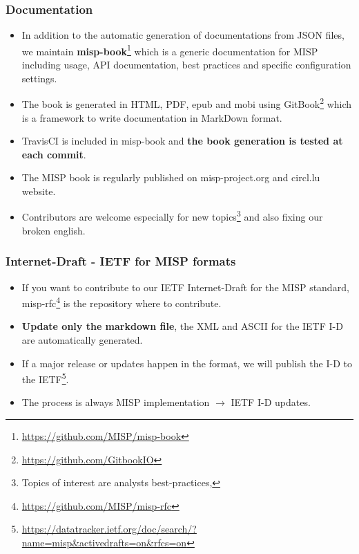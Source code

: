 \begin{frame}[fragile]
\frametitle{Documentation}
\begin{itemize}
\item In addition to the automatic generation of documentations from JSON files, we maintain {\bf misp-book}\footnote{\url{https://github.com/MISP/misp-book}} which is a generic documentation for MISP including usage, API documentation, best practices and specific configuration settings.
\item The book is generated in HTML, PDF, epub and mobi using GitBook\footnote{\url{https://github.com/GitbookIO}} which is a framework to write documentation in MarkDown format.
\item TravisCI is included in misp-book and {\bf the book generation is tested at each commit}.
\item The MISP book is regularly published on misp-project.org and circl.lu website.
\item Contributors are welcome especially for new topics\footnote{Topics of interest are analysts best-practices, } and also fixing our broken english.
\end{itemize}
\end{frame}

\begin{frame}[fragile]
\frametitle{Internet-Draft - IETF for MISP formats}
\begin{itemize}
\item If you want to contribute to our IETF Internet-Draft for the MISP standard, misp-rfc\footnote{\url{https://github.com/MISP/misp-rfc}} is the repository where to contribute.
\item {\bf Update only the markdown file}, the XML and ASCII for the IETF I-D are automatically generated.
\item If a major release or updates happen in the format, we will publish the I-D to the IETF\footnote{\url{https://datatracker.ietf.org/doc/search/?name=misp&activedrafts=on&rfcs=on}}.
\item The process is always MISP implementation $\rightarrow$ IETF I-D updates.
\end{itemize}

\end{frame}



